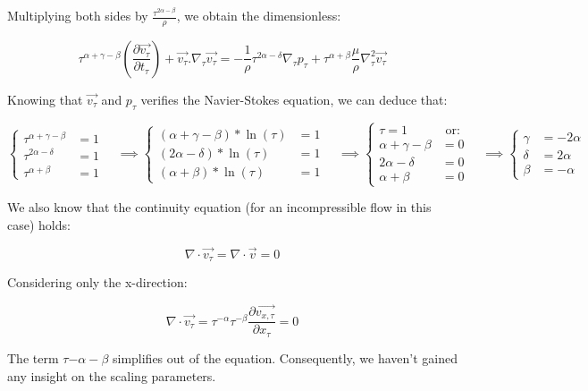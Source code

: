 Multiplying both sides by $\frac{\tau^{2\alpha - \beta}}{\rho}$, we obtain the dimensionless:

\begin{equation}
\tau^{\alpha + \gamma - \beta} \left( \frac{\partial \vec{v_{\tau}}}{\partial t_{\tau}} \right) + \vec{v_{\tau}}.\nabla_{\tau} \vec{v_{\tau}} = - \frac{1}{\rho}\tau^{2\alpha - \delta} \nabla_{\tau} p_{\tau} + \tau^{\alpha + \beta} \frac{\mu}{\rho} \nabla_{\tau}^2 \vec{v_{\tau}}
\end{equation}


Knowing that $\vec{v_{\tau}}$ and $p_{\tau}$ verifies the Navier-Stokes equation, we can deduce that:


\begin{equation*}
\begin{cases} \tau^{\alpha + \gamma - \beta} & = 1 \\ \tau^{2\alpha - \delta} & = 1 \\ \tau^{\alpha + \beta} & = 1 \end{cases} \quad
\implies \begin{cases} (\alpha + \gamma - \beta)*\ln(\tau) & = 1 \\ (2\alpha - \delta)*\ln(\tau) & = 1 \\ (\alpha + \beta)*\ln(\tau) & = 1 \end{cases} \quad
\implies \begin{cases} \tau = 1 & \text{ or:} \\ \alpha + \gamma - \beta & = 0 \\ 2\alpha - \delta & = 0 \\ \alpha + \beta & = 0 \end{cases} \quad
\implies \begin{cases} \gamma & = -2\alpha \\ \delta & = 2\alpha  \\ \beta & = - \alpha \end{cases} \quad
\end{equation*}


We also know that the continuity equation (for an incompressible flow in this case) holds:

\begin{equation}
\nabla \cdot \vec{v_{\tau}} = \nabla \cdot \vec{v} = 0
\end{equation}

Considering only the x-direction:

\begin{equation}
\nabla \cdot \vec{v_{\tau}} = \tau^{-\alpha}\tau^{-\beta}\frac{\partial \vec{v_{x, \tau}}}{\partial x_{\tau}} = 0
\end{equation}

The term $\tau{-\alpha - \beta}$ simplifies out of the equation. Consequently, we haven't gained any insight on the scaling parameters.
